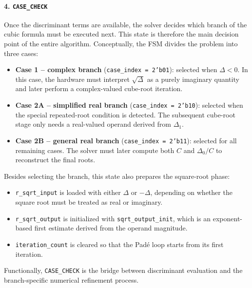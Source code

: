 \paragraph{4. \texttt{CASE\_CHECK}}
Once the discriminant terms are available, the solver decides which branch of the cubic formula must be executed next. This state is therefore the main decision point of the entire algorithm. Conceptually, the FSM divides the problem into three cases:
\begin{itemize}
    \item \textbf{Case 1 -- complex branch} (\texttt{case\_index = 2'b01}): selected when $\Delta < 0$. In this case, the hardware must interpret $\sqrt{\Delta}$ as a purely imaginary quantity and later perform a complex-valued cube-root iteration.
    \item \textbf{Case 2A -- simplified real branch} (\texttt{case\_index = 2'b10}): selected when the special repeated-root condition is detected. The subsequent cube-root stage only needs a real-valued operand derived from $\Delta_1$.
    \item \textbf{Case 2B -- general real branch} (\texttt{case\_index = 2'b11}): selected for all remaining cases. The solver must later compute both $C$ and $\Delta_0/C$ to reconstruct the final roots.
\end{itemize}

Besides selecting the branch, this state also prepares the square-root phase:
\begin{itemize}
    \item \texttt{r\_sqrt\_input} is loaded with either $\Delta$ or $-\Delta$, depending on whether the square root must be treated as real or imaginary.
    \item \texttt{r\_sqrt\_output} is initialized with \texttt{sqrt\_output\_init}, which is an exponent-based first estimate derived from the operand magnitude.
    \item \texttt{iteration\_count} is cleared so that the Pad\'e loop starts from its first iteration.
\end{itemize}
Functionally, \texttt{CASE\_CHECK} is the bridge between discriminant evaluation and the branch-specific numerical refinement process.

